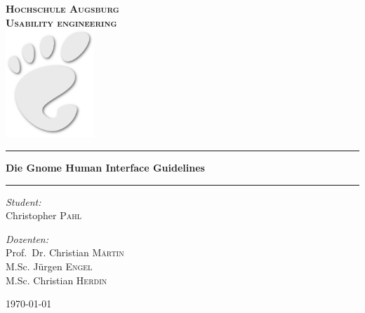 \documentclass[11pt,ngerman,toc=listof,index=totoc]{scrreprt}
\date{\today}
\begin{document}
\begin{titlepage}
\pagecolor{titlepagecolor}
\begin{center}

\bf
\color{titlepagefontcolor}
\textsc{\huge Hochschule Augsburg}\\[1.5cm]
\textsc{\LARGE Usability engineering}\\[0.5cm]

\includegraphics[width=0.25\textwidth]{docs/pics/title.png}~\\[1cm]

\rule{\linewidth}{0.5mm}
{\Huge \bfseries Die Gnome Human Interface Guidelines\\[0.4cm] }
\rule{\linewidth}{0.5mm}

\noindent
\begin{minipage}[t]{0.4\textwidth}
\begin{flushleft} \Large
\emph{Student:}\\
\textnormal{Christopher \textsc{Pahl}}
\end{flushleft}
\end{minipage}%
\begin{minipage}[t]{0.4\textwidth}
\begin{flushright} \Large
\emph{Dozenten:} \\
\textnormal{Prof.\ Dr. Christian \textsc{Märtin}} \\
\textnormal{M.Sc. Jürgen \textsc{Engel}} \\
\textnormal{M.Sc. Christian \textsc{Herdin}}
\end{flushright}
\end{minipage}

\vfill

{\large \today}
\end{center}
\end{titlepage}
\nopagecolor
\end{document}

